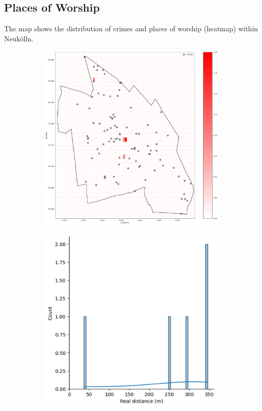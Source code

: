 \subsection{Places of Worship}
The map shows the distribution of crimes and places of worship (heatmap) within Neukölln. 
\begin{figure}[h]
    \centering
    \begin{subfigure}[b]{0.45\textwidth}
        \centering
        \includegraphics[width=\textwidth]{./figures/Gerard/worship.png}
        \caption{}
        \label{fig:image1}
    \end{subfigure}
    \hfill
    \begin{subfigure}[b]{0.45\textwidth}
        \centering
        \includegraphics[width=\textwidth]{./figures/Gerard/worship_1.png}

\end{subfigure}
\end{figure}
